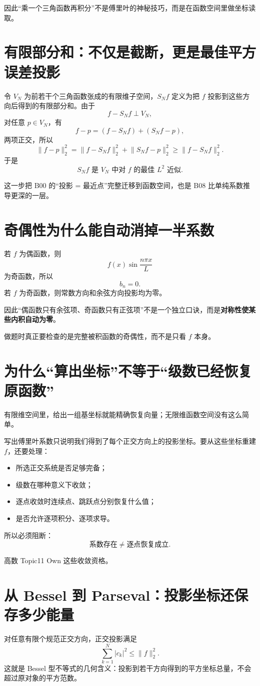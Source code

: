 \documentclass[profile=standard]{ipara-handbook}
\begin{document}
因此“乘一个三角函数再积分”不是傅里叶的神秘技巧，而是在函数空间里做坐标读取。

\section{有限部分和：不仅是截断，更是最佳平方误差投影}
令 $V_N$ 为前若干个三角函数张成的有限维子空间，$S_Nf$ 定义为把 $f$ 投影到这些方向后得到的有限部分和。由于
\[
f-S_Nf\perp V_N,
\]
对任意 $p\in V_N$，有
\[
f-p=(f-S_Nf)+(S_Nf-p),
\]
两项正交，所以
\[
\lVert f-p\rVert_2^2
=\lVert f-S_Nf\rVert_2^2+\lVert S_Nf-p\rVert_2^2
\ge \lVert f-S_Nf\rVert_2^2.
\]
于是
\[
\boxed{S_Nf\text{ 是 }V_N\text{ 中对 }f\text{ 的最佳 }L^2\text{ 近似}.}
\]

这一步把 B00 的“投影 = 最近点”完整迁移到函数空间，也是 B08 比单纯系数推导更深的一层。

\section{奇偶性为什么能自动消掉一半系数}
若 $f$ 为偶函数，则
\[
f(x)\sin\frac{n\pi x}{L}
\]
为奇函数，所以
\[
b_n=0.
\]
若 $f$ 为奇函数，则常数方向和余弦方向投影均为零。

因此“偶函数只有余弦项、奇函数只有正弦项”不是一个独立口诀，而是\textbf{对称性使某些内积自动为零}。

做题时真正要检查的是完整被积函数的奇偶性，而不是只看 $f$ 本身。

\section{为什么“算出坐标”不等于“级数已经恢复原函数”}
有限维空间里，给出一组基坐标就能精确恢复向量；无限维函数空间没有这么简单。

写出傅里叶系数只说明我们得到了每个正交方向上的投影坐标。要从这些坐标重建 $f$，还要处理：
\begin{itemize}
\item 所选正交系统是否足够完备；
\item 级数在哪种意义下收敛；
\item 逐点收敛时连续点、跳跃点分别恢复什么值；
\item 是否允许逐项积分、逐项求导。
\end{itemize}

所以必须阻断：
\[
\boxed{\text{系数存在}\neq\text{逐点恢复成立}.}
\]

高数 Topic11 Own 这些收敛资格。

\section{从 Bessel 到 Parseval：投影坐标还保存多少能量}
对任意有限个规范正交方向，正交投影满足
\[
\sum_{k=1}^N\lvert c_k\rvert^2\le \lVert f\rVert_2^2.
\]
这就是 Bessel 型不等式的几何含义：投影到若干方向得到的平方坐标总量，不会超过原对象的平方范数。
\end{document}
